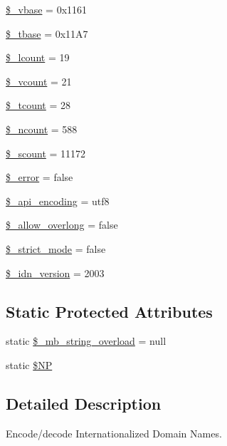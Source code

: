 \begin{DoxyCompactItemize}
\item 
\hyperlink{classidna__convert_a2e984a3fe1e2e4d5192dd9a5220e9c29}{\$\+\_\+vbase} = 0x1161
\item 
\hyperlink{classidna__convert_a5b728e6ff6e15773c914383a66651826}{\$\+\_\+tbase} = 0x11\+A7
\item 
\hyperlink{classidna__convert_ae191087842e21e5f56a0df02f922abbe}{\$\+\_\+lcount} = 19
\item 
\hyperlink{classidna__convert_afe217921aaa9aa954361f3aa090c69c1}{\$\+\_\+vcount} = 21
\item 
\hyperlink{classidna__convert_a81a70a95e18fde08ec6633f0095c92c6}{\$\+\_\+tcount} = 28
\item 
\hyperlink{classidna__convert_a0e6408f36ff8f150adb9d1a67c7fe3e2}{\$\+\_\+ncount} = 588
\item 
\hyperlink{classidna__convert_aa422586662f0878841bd8dcda663c058}{\$\+\_\+scount} = 11172
\item 
\hyperlink{classidna__convert_ae3825ac4f637ed992ef96f261647c396}{\$\+\_\+error} = false
\item 
\hyperlink{classidna__convert_abc9b2aaad4b02a40602f254ac44ab973}{\$\+\_\+api\+\_\+encoding} = \textquotesingle{}utf8\textquotesingle{}
\item 
\hyperlink{classidna__convert_a7a40288feb2a5635c567a28710017e56}{\$\+\_\+allow\+\_\+overlong} = false
\item 
\hyperlink{classidna__convert_a6457ade57cb55c7b44bfbf8686c2c2d5}{\$\+\_\+strict\+\_\+mode} = false
\item 
\hyperlink{classidna__convert_a14edc7c94d7c9c05a8a7eada24901dfd}{\$\+\_\+idn\+\_\+version} = 2003
\end{DoxyCompactItemize}
\subsection*{Static Protected Attributes}
\begin{DoxyCompactItemize}
\item 
static \hyperlink{classidna__convert_a36aba0d7717782343396a25026107dc7}{\$\+\_\+mb\+\_\+string\+\_\+overload} = null
\item 
static \hyperlink{classidna__convert_a82881f4c426f3e6603e252c8bebc875f}{\$\+NP}
\end{DoxyCompactItemize}


\subsection{Detailed Description}
Encode/decode Internationalized Domain Names.

